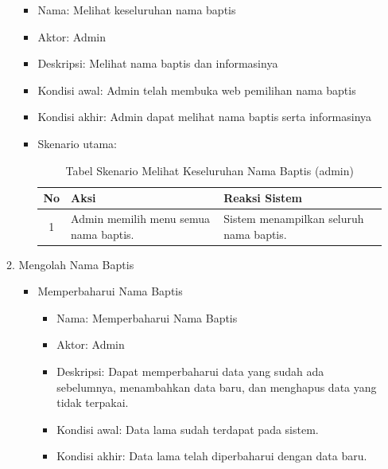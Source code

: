 \begin{enumerate}
\begin{enumerate}
                         \begin{itemize}
                                        \item Nama: Melihat keseluruhan nama baptis
                                        \item Aktor: Admin
                                        \item Deskripsi: Melihat nama baptis dan informasinya
                                        \item Kondisi awal: Admin telah membuka web pemilihan nama baptis  %
                                        \item Kondisi akhir: Admin dapat melihat nama baptis serta informasinya %
                                        \item Skenario utama:														
				
				\begin{table}[H]
	\centering
	\caption{Tabel Skenario Melihat Keseluruhan Nama Baptis (admin)}
		\begin{tabular}{ | c | p{5cm} |p{5cm} |} \hline
     No  & Aksi & Reaksi Sistem\\ \hline 
				1 & Admin memilih menu semua nama baptis.%
				&  Sistem menampilkan seluruh nama baptis.\\ \hline
		
						\end{tabular}
	\label{table:skenario3}
\end{table}
				
				
																
																       \end{itemize}
																
                                \item Mengolah Nama Baptis
\begin{itemize}
\item Memperbaharui Nama Baptis
\begin{itemize}
                                        \item Nama: Memperbaharui Nama Baptis
                                        \item Aktor: Admin
                                        \item Deskripsi: Dapat memperbaharui data yang sudah ada sebelumnya, menambahkan data baru, dan menghapus data yang tidak terpakai.
                                        \item Kondisi awal: Data lama sudah terdapat pada sistem. %
                                        \item Kondisi akhir: Data lama telah diperbaharui dengan data baru. %
            

\end{itemize}
\end{itemize}
\end{enumerate}
\end{enumerate}
